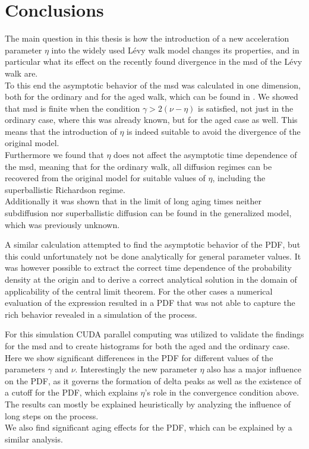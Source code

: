 \chapter{Conclusions}

The main question in this thesis is how the introduction of a new acceleration parameter $\eta$ into the widely used L\'evy walk model changes its properties, and in particular what its effect on the recently found divergence in the \gls*{msd} of the L\'evy walk are. \\
To this end the asymptotic behavior of the \gls*{msd} was calculated in one dimension, both for the ordinary and for the aged walk, which can be found in 
\cite{bothe}. 
We showed that \gls*{msd} is finite when the condition $\gamma > 2(\nu-\eta)$ is satisfied, not just in the ordinary case, where this was already known\cite{radons2018}, 
but for the aged case as well. This means that the introduction of $\eta$ is indeed suitable to avoid the divergence of the original model. \\
Furthermore we found that $\eta$ does not affect the asymptotic time dependence of the \gls*{msd}, meaning that for the ordinary walk, all diffusion regimes can be recovered from the original model for suitable values of $\eta$, including the superballistic Richardson regime. \\
Additionally it was shown that in the limit of long aging times neither subdiffusion nor superballistic diffusion can be found in the generalized model, which was previously unknown.

A similar calculation attempted to find the asymptotic behavior of the \gls*{PDF}, but this could unfortunately not be done analytically for general parameter values. It was however possible to extract the correct time dependence of the probability density at the origin and to derive a correct analytical solution in the domain of applicability of the central limit theorem. For the other cases a numerical evaluation of the expression resulted in a \gls*{PDF} that was not able to capture the rich behavior revealed in a simulation of the process. 

For this simulation CUDA parallel computing was utilized to validate the findings for the \gls*{msd} and to create histograms for both the aged and the ordinary case. Here we show significant differences in the \gls*{PDF} for different values of the parameters $\gamma$ and $\nu$. Interestingly the new parameter $\eta$ also has a major influence on the \gls*{PDF}, as it governs the formation of delta peaks as well as the existence of a cutoff for the \gls*{PDF}, which explains $\eta$'s role in the convergence condition above. The results can mostly be explained heuristically by analyzing the influence of long steps on the process. \\
We also find significant aging effects for the \gls*{PDF}, which can be explained by a similar analysis.


